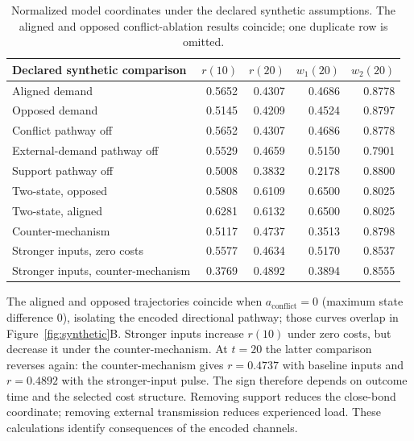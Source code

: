 \begin{table}[H]\centering\small

\begin{tabularx}{\textwidth}{@{}Yrrrr@{}}\toprule

Declared synthetic comparison & $r(10)$ & $r(20)$ & $w_1(20)$ & $w_2(20)$ \\\midrule

Aligned demand & 0.5652 & 0.4307 & 0.4686 & 0.8778 \\

Opposed demand & 0.5145 & 0.4209 & 0.4524 & 0.8797 \\

Conflict pathway off & 0.5652 & 0.4307 & 0.4686 & 0.8778 \\

External-demand pathway off & 0.5529 & 0.4659 & 0.5150 & 0.7901 \\

Support pathway off & 0.5008 & 0.3832 & 0.2178 & 0.8800 \\

Two-state, opposed & 0.5808 & 0.6109 & 0.6500 & 0.8025 \\

Two-state, aligned & 0.6281 & 0.6132 & 0.6500 & 0.8025 \\

Counter-mechanism & 0.5117 & 0.4737 & 0.3513 & 0.8798 \\

Stronger inputs, zero costs & 0.5577 & 0.4634 & 0.5170 & 0.8537 \\

Stronger inputs, counter-mechanism & 0.3769 & 0.4892 & 0.3894 & 0.8555 \\

\bottomrule\end{tabularx}

\caption{Normalized model coordinates under the declared synthetic assumptions. The aligned and opposed conflict-ablation results coincide; one duplicate row is omitted.}\label{tab:synthetic-results}\end{table}

The aligned and opposed trajectories coincide when $a_{\mathrm{conflict}}=0$ (maximum state difference $0$), isolating the encoded directional pathway; those curves overlap in Figure~\ref{fig:synthetic}B. Stronger inputs increase $r(10)$ under zero costs, but decrease it under the counter-mechanism. At $t=20$ the latter comparison reverses again: the counter-mechanism gives $r=0.4737$ with baseline inputs and $r=0.4892$ with the stronger-input pulse. The sign therefore depends on outcome time and the selected cost structure. Removing support reduces the close-bond coordinate; removing external transmission reduces experienced load. These calculations identify consequences of the encoded channels.


